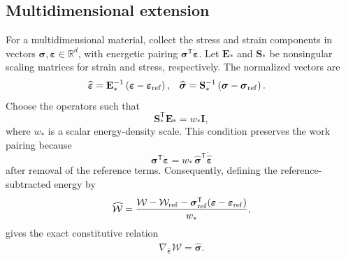 \documentclass[11pt]{article}
\begin{document}
\subsection{Multidimensional extension}

For a multidimensional material, collect the stress and strain components in
vectors $\boldsymbol{\sigma},\boldsymbol{\varepsilon}\in\mathbb{R}^d$, with
energetic pairing
$\boldsymbol{\sigma}^{\mathsf T}\dot{\boldsymbol{\varepsilon}}$.  Let
$\mathbf{E}_*$ and $\mathbf{S}_*$ be nonsingular scaling matrices for strain
and stress, respectively.  The normalized vectors are
\begin{align}
    \widehat{\boldsymbol{\varepsilon}}
      &=\mathbf{E}_*^{-1}
        \left(\boldsymbol{\varepsilon}
              -\boldsymbol{\varepsilon}_{\rm ref}\right),
    &
    \widehat{\boldsymbol{\sigma}}
      &=\mathbf{S}_*^{-1}
        \left(\boldsymbol{\sigma}
              -\boldsymbol{\sigma}_{\rm ref}\right).
\end{align}
Choose the operators such that
\begin{equation}
    \mathbf{S}_*^{\mathsf T}\mathbf{E}_*=w_*\mathbf{I},
\end{equation}
where $w_*$ is a scalar energy-density scale.  This condition preserves the
work pairing because
\begin{equation}
    \boldsymbol{\sigma}^{\mathsf T}
    \dot{\boldsymbol{\varepsilon}}
    =w_*\,
      \widehat{\boldsymbol{\sigma}}^{\mathsf T}
      \dot{\widehat{\boldsymbol{\varepsilon}}}
\end{equation}
after removal of the reference terms.  Consequently, defining the
reference-subtracted energy by
\begin{equation}
    \widehat{\mathcal{W}}
    =\frac{\mathcal{W}-\mathcal{W}_{\rm ref}
      -\boldsymbol{\sigma}_{\rm ref}^{\mathsf T}
       (\boldsymbol{\varepsilon}
        -\boldsymbol{\varepsilon}_{\rm ref})}{w_*},
\end{equation}
gives the exact constitutive relation
\begin{equation}
    \nabla_{\widehat{\boldsymbol{\varepsilon}}}
       \widehat{\mathcal{W}}
    =\widehat{\boldsymbol{\sigma}}.
\end{equation}
\end{document}
